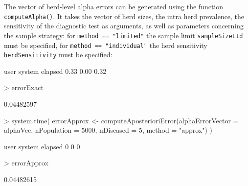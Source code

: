 \documentclass[nojss]{jss}
\begin{document}
The vector of herd-level alpha errors can be generated using the function \texttt{computeAlpha()}.  It takes the vector of herd sizes, the intra herd prevalence, the sensitivity of the diagnostic test as arguments, as well as parameters concerning the sample strategy: for \texttt{method == "limited"} the sample limit \texttt{sampleSizeLtd} must be specified, for \texttt{method == "individual"} the herd sensitivity \texttt{herdSensitivity} must be specified:

\begin{Schunk}
\begin{Soutput}
   user  system elapsed
   0.33    0.00    0.32
\end{Soutput}
\begin{Sinput}
> errorExact
\end{Sinput}
\begin{Soutput}
[1] 0.04482597
\end{Soutput}
\begin{Sinput}
> system.time({
   errorApprox <- computeAposterioriError(alphaErrorVector = alphaVec,
       nPopulation = 5000, nDiseased = 5, method = "approx")
   })
\end{Sinput}
\begin{Soutput}
   user  system elapsed
      0       0       0
\end{Soutput}
\begin{Sinput}
> errorApprox
\end{Sinput}
\begin{Soutput}
[1] 0.04482615
\end{Soutput}
\end{Schunk}



\printindex


\end{document}
